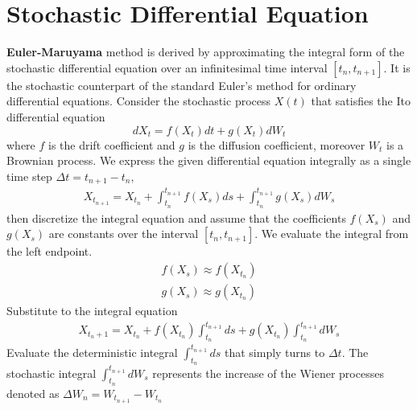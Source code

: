 \section*{Stochastic Differential Equation}
\textbf{Euler-Maruyama}\cite{wiki:euler-maruyama} method is derived by approximating the integral form of the stochastic differential equation over an infinitesimal time interval  $[t_n, t_{n+1}]$. It is the stochastic counterpart of the standard Euler's method for ordinary differential equations. Consider the stochastic process $X(t)$ that satisfies the Ito differential equation
\begin{equation}\tag{1}\label{eq:sde_1}
dX_t = f(X_t)dt + g(X_t)dW_t
\end{equation}
where $f$ is the drift coefficient and $g$ is the diffusion coefficient, moreover $W_t$ is a Brownian process.
We express the given differential equation integrally as a single time step $\Delta t= t_{n+1} - t_n$,
\begin{align*}
X_{t_{n+1}} = X_{t_n} + \int_{t_n}^{t_{n+1}} f(X_s)ds + \int_{t_n}^{t_{n+1}} g(X_s)dW_s
\end{align*}
then discretize the integral equation and assume that the coefficients $f(X_s)$ and $g(X_s)$ are constants over the interval $[t_n, t_{n+1}]$. We evaluate the integral from the left endpoint.
\begin{align*}
f(X_s) \approx f(X_{t_n})\\
g(X_s) \approx g(X_{t_n})
\end{align*}
Substitute to the integral equation
\begin{align*}
X_{t_n+1} =  X_{t_n} + f(X_{t_n}) \int_{t_n}^{t_{n+1}} ds + g(X_{t_n}) \int_{t_n}^{t_{n+1}} dW_s
\end{align*}
Evaluate the deterministic integral $\int_{t_n}^{t_{n+1}} ds$ that simply turns to $\Delta t$. The stochastic integral $\int_{t_n}^{t_{n+1}} dW_s$ represents the increase of the Wiener processes denoted as $\Delta W_n = W_{t_{n+1}} - W_{t_n}$

